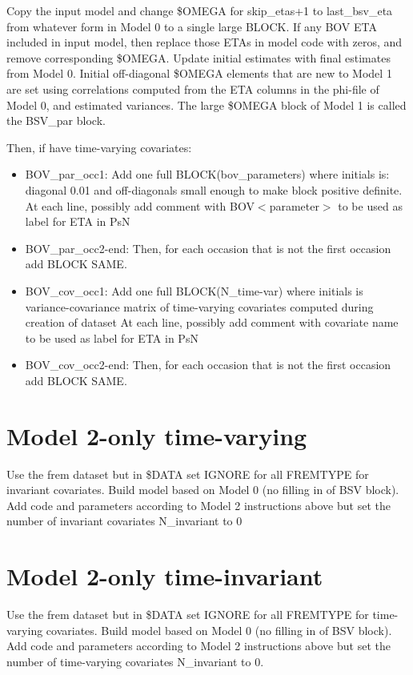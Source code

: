 Copy the input model and change \$OMEGA for skip\_etas+1 to last\_bsv\_eta
from whatever form in Model 0 to a single large BLOCK. If any BOV ETA included in input model,
then replace those ETAs in model code with zeros, and remove corresponding \$OMEGA.
Update initial estimates with final estimates from Model 0.
Initial off-diagonal \$OMEGA elements that are new to Model 1 are set using
correlations computed from the ETA columns in the phi-file of Model 0, and estimated variances.
The large \$OMEGA block of Model 1 is called the BSV\_par block.

Then, if have time-varying covariates:
\begin{itemize}
\item BOV\_par\_occ1: Add one full BLOCK(bov\_parameters) where initials is: diagonal 0.01 and off-diagonals small enough to make
block positive definite.
At each line, possibly add comment with BOV$<$parameter$>$ to be used as label for ETA in PsN
\item BOV\_par\_occ2-end: Then, for each occasion that is not the first occasion add BLOCK SAME.
\item BOV\_cov\_occ1: Add one full BLOCK(N\_time-var) where initials is variance-covariance matrix of time-varying covariates computed during creation of dataset
At each line, possibly add comment with covariate name to be used as label for ETA in PsN
\item BOV\_cov\_occ2-end: Then, for each occasion that is not the first occasion add BLOCK SAME.
\end{itemize}

\section{Model 2-only time-varying}
Use the frem dataset but in \$DATA set IGNORE for all FREMTYPE for invariant covariates. Build model based on Model 0 (no filling in of BSV block). Add code and parameters according to Model 2 instructions above but set the number of invariant covariates N\_invariant to 0

\section{Model 2-only time-invariant}
Use the frem dataset but in \$DATA set IGNORE for all FREMTYPE for time-varying covariates. Build model based on Model 0 (no filling in of BSV block). Add code and parameters according to Model 2 instructions above but set the number of time-varying covariates N\_invariant to 0.

